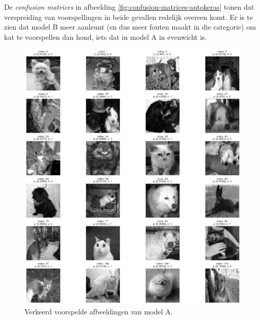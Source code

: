 \begin{minipage}{\textwidth}
De \textit{confusion matrices} in afbeelding \ref{fig:confusion-matrices-autokeras} tonen dat verspreiding van voorspellingen in beide gevallen redelijk overeen komt. Er is te zien dat model B meer aanleunt (en dus meer fouten maakt in die categorie) om kat te voorspellen dan hond, iets dat in model A in evenwicht is.
\end{minipage}

\begin{figure}
    \centering
    \includegraphics[width=\linewidth]{img/autokeras-5-wrong-images.png}
    \caption{Verkeerd voorspelde afbeeldingen van model A.}
    \label{fig:wrong-prediction-autokeras-5}
\end{figure}

